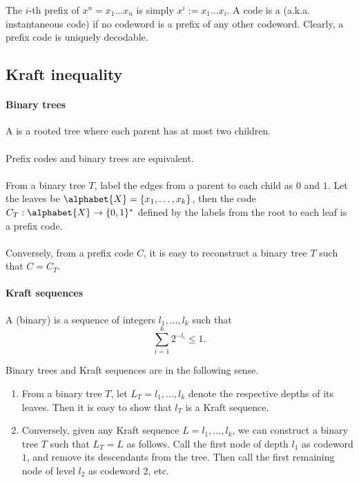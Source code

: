 \documentclass[a4paper, 11pt, openany]{book}
\begin{document}
The $i$-th prefix of $x^n = x_1 \ldots x_n$ is simply $x^i := x_1 \ldots x_i$. A code is a  (a.k.a. instantaneous code) if no codeword is a prefix of any other codeword. Clearly, a prefix code is uniquely decodable.








\subsection{Kraft inequality}

\paragraph{Binary trees}
A  is a rooted tree where each parent has at most two children.\\
~\\
Prefix codes and binary trees are equivalent.\\
~\\
From a binary tree $T$, label the edges from a parent to each child as $0$ and $1$. Let the leaves be $\alphabet{X} = \{x_1, \dots, x_k \}$, then the code $C_T :\alphabet{X} \to \{0,1\}^*$ defined by the labels from the root to each leaf is a prefix code.\\
~\\
Conversely, from a prefix code $C$, it is easy to reconstruct a binary tree $T$ such that $C = C_T$.



\paragraph{Kraft sequences}
A (binary)  is a sequence of integers $l_1, \dots, l_k$ such that
\[
	\sum_{i=1}^k 2^{-l_i} \le 1.
\]

Binary trees and Kraft sequences are  in the following sense.
\begin{enumerate}
    \item From a binary tree $T$, let $L_T = l_1, \dots, l_k$ denote the respective depths of its leaves. Then it is easy to show that $l_T$ is a Kraft sequence.

    \item Conversely, given any Kraft sequence $L = l_1, \dots, l_k$, we can construct a binary tree $T$ such that $L_T = L$ as follows. Call the first node of depth $l_1$ as codeword $1$, and remove its descendants from the tree. Then call the first remaining node of level $l_2$ as codeword 2, etc.
\end{enumerate}
\end{document}
